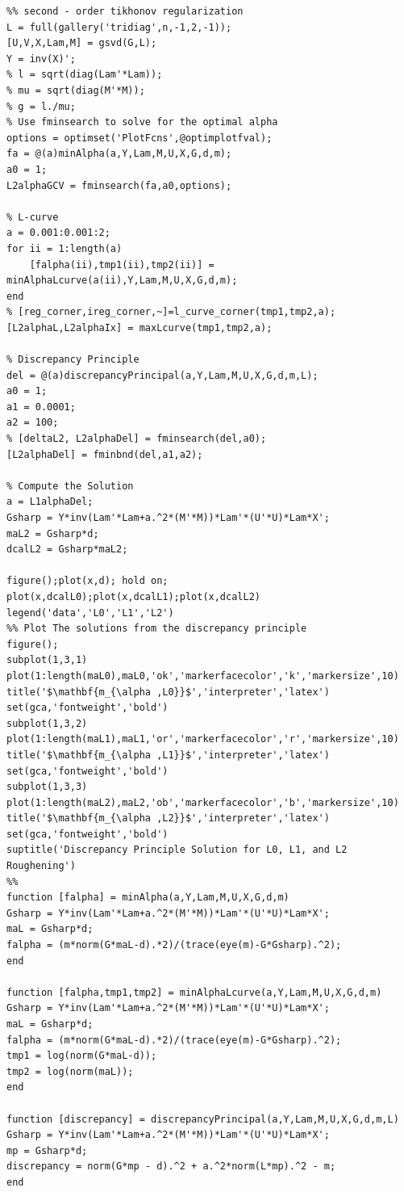 \documentclass{article}
\begin{document}
\begin{verbatim}
%% second - order tikhonov regularization
L = full(gallery('tridiag',n,-1,2,-1));
[U,V,X,Lam,M] = gsvd(G,L);
Y = inv(X)';
% l = sqrt(diag(Lam'*Lam));
% mu = sqrt(diag(M'*M));
% g = l./mu;
% Use fminsearch to solve for the optimal alpha
options = optimset('PlotFcns',@optimplotfval);
fa = @(a)minAlpha(a,Y,Lam,M,U,X,G,d,m);
a0 = 1;
L2alphaGCV = fminsearch(fa,a0,options);

% L-curve
a = 0.001:0.001:2;
for ii = 1:length(a)
    [falpha(ii),tmp1(ii),tmp2(ii)] = minAlphaLcurve(a(ii),Y,Lam,M,U,X,G,d,m);
end
% [reg_corner,ireg_corner,~]=l_curve_corner(tmp1,tmp2,a);
[L2alphaL,L2alphaIx] = maxLcurve(tmp1,tmp2,a);

% Discrepancy Principle
del = @(a)discrepancyPrincipal(a,Y,Lam,M,U,X,G,d,m,L);
a0 = 1;
a1 = 0.0001;
a2 = 100;
% [deltaL2, L2alphaDel] = fminsearch(del,a0);
[L2alphaDel] = fminbnd(del,a1,a2);

% Compute the Solution
a = L1alphaDel;
Gsharp = Y*inv(Lam'*Lam+a.^2*(M'*M))*Lam'*(U'*U)*Lam*X';
maL2 = Gsharp*d;
dcalL2 = Gsharp*maL2;

figure();plot(x,d); hold on; plot(x,dcalL0);plot(x,dcalL1);plot(x,dcalL2)
legend('data','L0','L1','L2')
%% Plot The solutions from the discrepancy principle
figure(); 
subplot(1,3,1)
plot(1:length(maL0),maL0,'ok','markerfacecolor','k','markersize',10)
title('$\mathbf{m_{\alpha ,L0}}$','interpreter','latex')
set(gca,'fontweight','bold')
subplot(1,3,2)
plot(1:length(maL1),maL1,'or','markerfacecolor','r','markersize',10)
title('$\mathbf{m_{\alpha ,L1}}$','interpreter','latex')
set(gca,'fontweight','bold')
subplot(1,3,3)
plot(1:length(maL2),maL2,'ob','markerfacecolor','b','markersize',10)
title('$\mathbf{m_{\alpha ,L2}}$','interpreter','latex')
set(gca,'fontweight','bold')
suptitle('Discrepancy Principle Solution for L0, L1, and L2 Roughening') 
%%
function [falpha] = minAlpha(a,Y,Lam,M,U,X,G,d,m)
Gsharp = Y*inv(Lam'*Lam+a.^2*(M'*M))*Lam'*(U'*U)*Lam*X';
maL = Gsharp*d;
falpha = (m*norm(G*maL-d).*2)/(trace(eye(m)-G*Gsharp).^2);
end

function [falpha,tmp1,tmp2] = minAlphaLcurve(a,Y,Lam,M,U,X,G,d,m)
Gsharp = Y*inv(Lam'*Lam+a.^2*(M'*M))*Lam'*(U'*U)*Lam*X';
maL = Gsharp*d;
falpha = (m*norm(G*maL-d).*2)/(trace(eye(m)-G*Gsharp).^2);
tmp1 = log(norm(G*maL-d));
tmp2 = log(norm(maL));
end

function [discrepancy] = discrepancyPrincipal(a,Y,Lam,M,U,X,G,d,m,L)
Gsharp = Y*inv(Lam'*Lam+a.^2*(M'*M))*Lam'*(U'*U)*Lam*X';
mp = Gsharp*d;
discrepancy = norm(G*mp - d).^2 + a.^2*norm(L*mp).^2 - m;
end


\end{verbatim}
\end{document}
